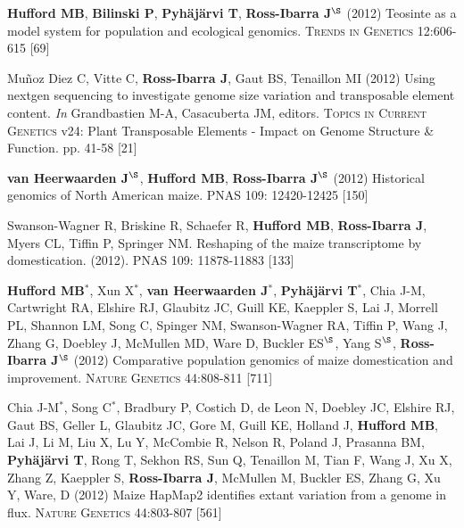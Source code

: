 \documentclass[letterpaper,10pt]{article}
\begin{document}
\begin{etaremune}
\item {\bf Hufford MB}, {\bf Bilinski P}, {\bf Pyh\"aj\"arvi T}, {\bf Ross-Ibarra J}$^\S$ (2012) Teosinte as a model system for population and ecological genomics. \textsc{Trends in Genetics} 12:606-615 %
 [69]\\


\item Mu\~{n}oz Diez C, Vitte C, {\bf Ross-Ibarra J}, Gaut BS, Tenaillon MI (2012) Using nextgen sequencing to investigate genome size variation and transposable element content. \emph{In} Grandbastien M-A, Casacuberta JM, editors. \textsc{Topics in Current Genetics} v24: Plant Transposable Elements - Impact on Genome Structure \& Function. pp. 41-58
 [21]\\


\item  {\bf van Heerwaarden J}$^\S$, {\bf Hufford MB}, {\bf Ross-Ibarra J}$^\S$ (2012) Historical genomics of North American maize. \textsc{PNAS} 109: 12420-12425
 [150]\\


\item Swanson-Wagner R, Briskine R, Schaefer R, {\bf Hufford MB}, {\bf Ross-Ibarra J}, Myers CL, Tiffin P, Springer NM.  Reshaping of the maize transcriptome by domestication. (2012). \textsc{PNAS}  109: 11878-11883
 [133]\\


\item {\bf Hufford MB}$^*$, Xun X$^*$, {\bf van Heerwaarden J}$^*$, {\bf Pyh\"aj\"arvi T}$^*$, Chia J-M, Cartwright RA, Elshire RJ, Glaubitz JC, Guill KE, Kaeppler S, Lai J, Morrell PL, Shannon LM, Song C, Spinger NM, Swanson-Wagner RA, Tiffin P, Wang J, Zhang G, Doebley J, McMullen MD, Ware D, Buckler ES$^\S$, Yang S$^\S$, {\bf Ross-Ibarra J}$^\S$ (2012) Comparative population genomics of maize domestication and improvement. \textsc{Nature Genetics} 44:808-811 %
 [711]\\


\item  Chia J-M$^*$, Song C$^*$, Bradbury P, Costich D, de Leon N, Doebley JC, Elshire RJ, Gaut BS, Geller L, Glaubitz JC, Gore M, Guill KE, Holland J,  {\bf Hufford MB}, Lai J, Li M, Liu X, Lu Y, McCombie R, Nelson R, Poland J, Prasanna BM,  {\bf Pyh\"aj\"arvi T}, Rong T, Sekhon RS,  Sun Q, Tenaillon M, Tian F, Wang J, Xu X, Zhang Z, Kaeppler S, {\bf Ross-Ibarra J}, McMullen M, Buckler ES, Zhang G, Xu Y, Ware, D (2012) Maize HapMap2 identifies extant variation from a genome in flux. \textsc{Nature Genetics} 44:803-807 %
 [561]\\



\end{etaremune}
\end{document}
